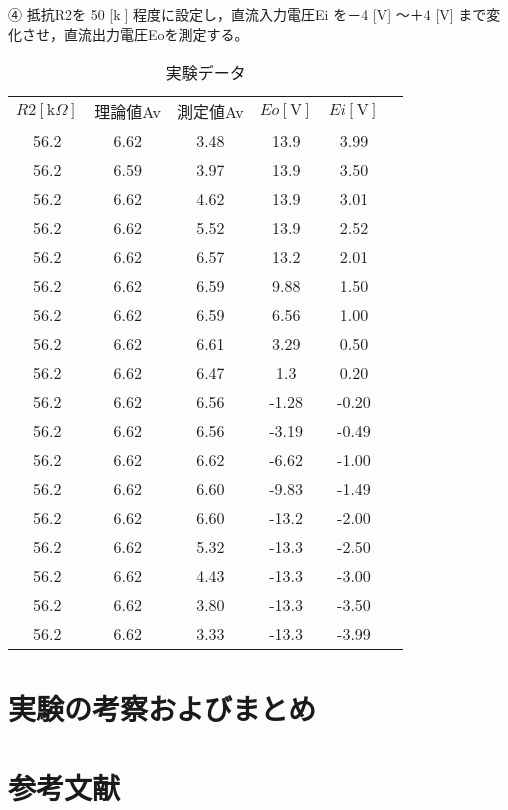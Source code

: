 \documentclass[a4paper,11pt,xelatex,ja=standard]{bxjsarticle}
\begin{document}
    ④	抵抗R2を 50 [k] 程度に設定し，直流入力電圧Ei を－4 [V] ～＋4 [V] まで変化させ，直流出力電圧Eoを測定する。

    
    \begin{table}[htbp]
        \centering
        \caption{実験データ}
          \begin{tabular}{cccccc}
          $R2[\mathrm{k}\Omega]$ & 理論値Av & 測定値Av & $Eo[\mathrm{V}]$ & $Ei[\mathrm{V}]$ \\
          56.2  & 6.62  & 3.48  & 13.9  & 3.99 \\
          56.2  & 6.59  & 3.97  & 13.9  & 3.50 \\
          56.2  & 6.62  & 4.62  & 13.9  & 3.01 \\
          56.2  & 6.62  & 5.52  & 13.9  & 2.52 \\
          56.2  & 6.62  & 6.57  & 13.2  & 2.01 \\
          56.2  & 6.62  & 6.59  & 9.88  & 1.50 \\
          56.2  & 6.62  & 6.59  & 6.56  & 1.00 \\
          56.2  & 6.62  & 6.61  & 3.29  & 0.50 \\
          56.2  & 6.62  & 6.47  & 1.3   & 0.20 \\
          56.2  & 6.62  & 6.56  & -1.28 & -0.20 \\
          56.2  & 6.62  & 6.56  & -3.19 & -0.49 \\
          56.2  & 6.62  & 6.62  & -6.62 & -1.00 \\
          56.2  & 6.62  & 6.60  & -9.83 & -1.49 \\
          56.2  & 6.62  & 6.60  & -13.2 & -2.00 \\
          56.2  & 6.62  & 5.32  & -13.3 & -2.50 \\
          56.2  & 6.62  & 4.43  & -13.3 & -3.00 \\
          56.2  & 6.62  & 3.80  & -13.3 & -3.50 \\
          56.2  & 6.62  & 3.33  & -13.3 & -3.99 \\
          \end{tabular}%
        \label{tab:data}%
      \end{table}%
      
    

\section{実験の考察およびまとめ}
\section{参考文献}
\end{document}
